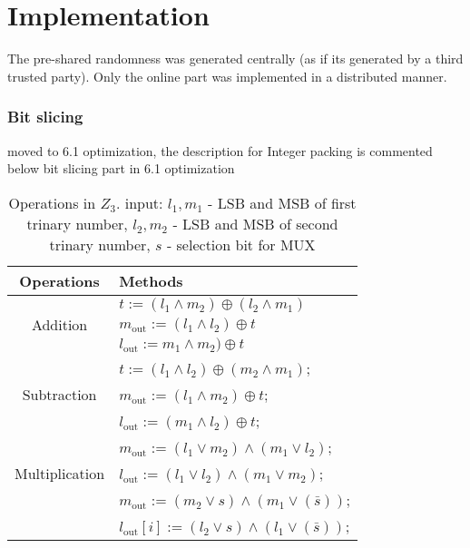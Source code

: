 \newpage
\section{Implementation}
\label{sec:technical_overview}

The pre-shared randomness was generated centrally (as if its generated by a third trusted party). Only the online part was implemented in a distributed manner. 





\subsubsection{Bit slicing} 
moved to 6.1 optimization, the description for Integer packing is commented below bit slicing part in 6.1 optimization




\begin{table}[ht]
	\caption{Operations in $Z_3$. input:   ${l_1}, {m_1}$ - LSB and MSB  of first trinary number, 
		${l_2}, {m_2}$ - LSB and MSB  of second trinary number,  ${s}$ - selection bit for MUX}
	\begin{center}
		\begin{tabular}{|c|l|}
			\hline
			\textbf{Operations} & \textbf{Methods}\\
			\hline
			\multirow{3}{*}{Addition} & ${t} := ({l_1 \wedge m_2}) \oplus ({l_2 \wedge m_1})$\\
			& $m_{\mathrm{out}} := ( l_1 \wedge  l_2 ) \oplus  t $ \\
			& $l_{\mathrm{out}} :=m_1 \wedge m_2 ) \oplus t $ \\
			\hline
			\multirow{3}{*}{Subtraction} & ${t} := ({l_1} \wedge {l_2}) \oplus ({m_2} \wedge {m_1})$;\\
			& $m_{\mathrm{out}} := (l_1 \wedge m_2 ) \oplus t$;\\
			& $l_{\mathrm{out}} := (m_1 \wedge l_2 ) \oplus t$; \\
			\hline
			\multirow{3}{*}{Multiplication} & $m_{\mathrm{out}}:= (l_1 \vee m_2) \wedge   (m_1 \vee l_2)$; \\
			& $l_{\mathrm{out}} := (l_1 \vee l_2) \wedge     (m_1 \vee m_2)$;\\
			\hline
			\multirow{3}{*}{MUX} & $m_{\mathrm{out}} :=( m_2 \vee s) \wedge (m_1 \vee (\bar{s}) )$; \\
			& $l_{\mathrm{out}}[i] :=( l_2 \vee s) \wedge (l_1 \vee (\bar{s}) )$; \\
			\hline
			
		\end{tabular}
	\end{center}
	\label{tab:multicol}
\end{table}


